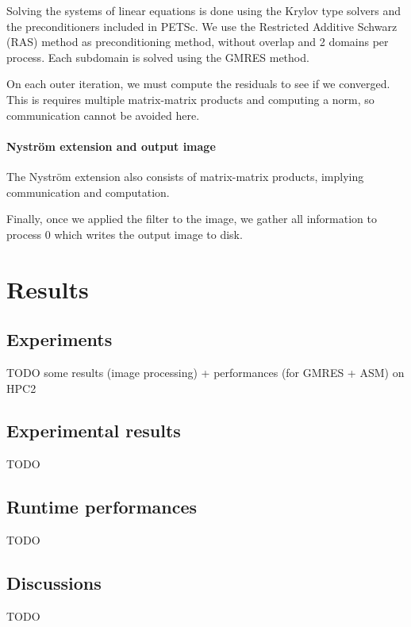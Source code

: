 Solving the systems of linear equations is done using the Krylov type solvers and the preconditioners included in PETSc.
We use the Restricted Additive Schwarz (RAS) method as preconditioning method, without overlap and 2 domains per process.
Each subdomain is solved using the GMRES method.

On each outer iteration, we must compute the residuals to see if we converged.
This is requires multiple matrix-matrix products and computing a norm, so communication cannot be avoided here.

\paragraph{Nystr\"om extension and output image}
The Nystr\"om extension also consists of matrix-matrix products, implying communication and computation.

Finally, once we applied the filter to the image, we gather all information to process 0 which writes the output image to disk.

\section{Results}

\subsection{Experiments}
TODO some results (image processing) + performances (for GMRES + ASM) on HPC2

\subsection{Experimental results}
TODO

\subsection{Runtime performances}
TODO

\subsection{Discussions}
TODO

